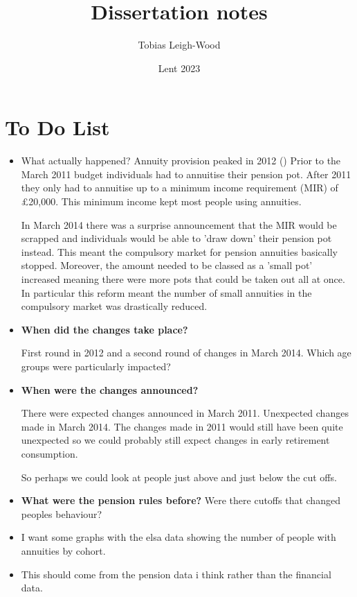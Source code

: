 \documentclass[12pt]{article}
\date{Lent 2023}
\title{Dissertation notes}
\author{Tobias Leigh-Wood}
\begin{document}
\maketitle

\section*{To Do List}
\begin{itemize}
    \item What actually happened?
          Annuity provision peaked in 2012 (\cite{cannon_effect_2016}) Prior to the March 2011 budget individuals had to annuitise their pension pot.
          After 2011 they only had to annuitise up to a minimum income requirement (MIR) of £20,000. This minimum income kept most people using annuities.

          In March 2014 there was a surprise announcement that the MIR would be scrapped and individuals would be able to 'draw down' their pension pot instead.
          This meant the compulsory market for pension annuities basically stopped. Moreover, the amount needed to be classed as a 'small pot' increased meaning there were more pots that could be taken out all at once.
          In particular this reform meant the number of small annuities in the compulsory market was drastically reduced.


    \item \textbf{When did the changes take place?}

          First round in 2012 and a second round of changes in March 2014. Which age groups were particularly impacted?

    \item \textbf{When were the changes announced?}

          There were expected changes announced in March 2011. Unexpected changes made in March 2014.
          The changes made in 2011 would still have been quite unexpected so we could probably still expect changes in early retirement consumption.

          So perhaps we could look at people just above and just below the cut offs.
    \item \textbf{What were the pension rules before?}
          Were there cutoffs that changed peoples behaviour?

\end{itemize}

\begin{itemize}
    \item I want some graphs with the elsa data showing the number of people with annuities by cohort.
    \item This should come from the pension data i think rather than the financial data.
\end{itemize}



\end{document}
